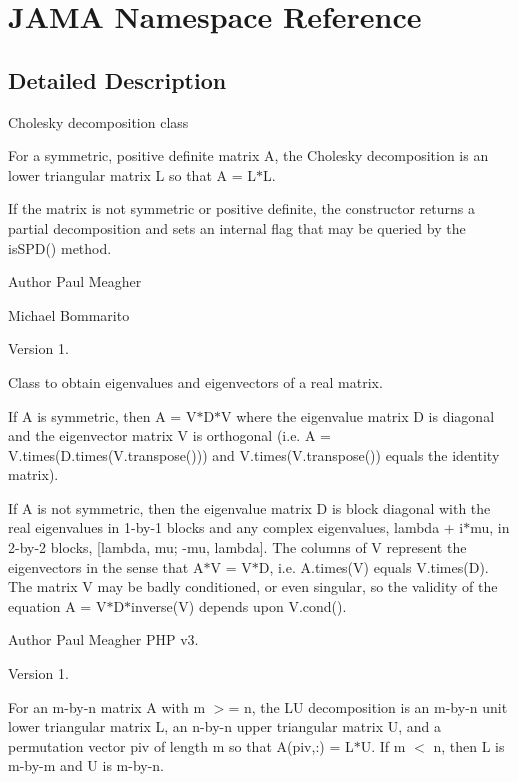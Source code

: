 \hypertarget{namespaceJAMA}{}\section{J\+A\+MA Namespace Reference}
\label{namespaceJAMA}


\subsection{Detailed Description}
Cholesky decomposition class

For a symmetric, positive definite matrix A, the Cholesky decomposition is an lower triangular matrix L so that A = L$\ast$L\textquotesingle{}.

If the matrix is not symmetric or positive definite, the constructor returns a partial decomposition and sets an internal flag that may be queried by the is\+S\+P\+D() method.

\begin{DoxyAuthor}{Author}
Paul Meagher 

Michael Bommarito 
\end{DoxyAuthor}
\begin{DoxyVersion}{Version}
1.
\end{DoxyVersion}
Class to obtain eigenvalues and eigenvectors of a real matrix.

If A is symmetric, then A = V$\ast$\+D$\ast$V\textquotesingle{} where the eigenvalue matrix D is diagonal and the eigenvector matrix V is orthogonal (i.\+e. A = V.\+times(D.\+times(V.\+transpose())) and V.\+times(V.\+transpose()) equals the identity matrix).

If A is not symmetric, then the eigenvalue matrix D is block diagonal with the real eigenvalues in 1-\/by-\/1 blocks and any complex eigenvalues, lambda + i$\ast$mu, in 2-\/by-\/2 blocks, \mbox{[}lambda, mu; -\/mu, lambda\mbox{]}. The columns of V represent the eigenvectors in the sense that A$\ast$V = V$\ast$D, i.\+e. A.\+times(\+V) equals V.\+times(\+D). The matrix V may be badly conditioned, or even singular, so the validity of the equation A = V$\ast$\+D$\ast$inverse(V) depends upon V.\+cond().

\begin{DoxyAuthor}{Author}
Paul Meagher  P\+HP v3. 
\end{DoxyAuthor}
\begin{DoxyVersion}{Version}
1.
\end{DoxyVersion}
For an m-\/by-\/n matrix A with m $>$= n, the LU decomposition is an m-\/by-\/n unit lower triangular matrix L, an n-\/by-\/n upper triangular matrix U, and a permutation vector piv of length m so that A(piv,\+:) = L$\ast$U. If m $<$ n, then L is m-\/by-\/m and U is m-\/by-\/n.

